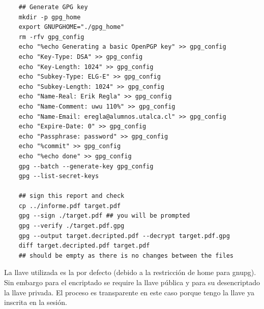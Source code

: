 \documentclass[11pt]{utalcaDoc}
\begin{document}
\begin{verbatim}
	## Generate GPG key
	mkdir -p gpg_home
	export GNUPGHOME="./gpg_home"
	rm -rfv gpg_config
	echo "%echo Generating a basic OpenPGP key" >> gpg_config
	echo "Key-Type: DSA" >> gpg_config
	echo "Key-Length: 1024" >> gpg_config
	echo "Subkey-Type: ELG-E" >> gpg_config
	echo "Subkey-Length: 1024" >> gpg_config
	echo "Name-Real: Erik Regla" >> gpg_config
	echo "Name-Comment: uwu 110%" >> gpg_config
	echo "Name-Email: eregla@alumnos.utalca.cl" >> gpg_config
	echo "Expire-Date: 0" >> gpg_config
	echo "Passphrase: password" >> gpg_config
	echo "%commit" >> gpg_config
	echo "%echo done" >> gpg_config
	gpg --batch --generate-key gpg_config
	gpg --list-secret-keys
	
	## sign this report and check
	cp ../informe.pdf target.pdf
	gpg --sign ./target.pdf ## you will be prompted
	gpg --verify ./target.pdf.gpg
	gpg --output target.decripted.pdf --decrypt target.pdf.gpg
	diff target.decripted.pdf target.pdf 
	## should be empty as there is no changes between the files
\end{verbatim}

La llave utilizada es la por defecto (debido a la restricción de home para gnupg). Sin embargo para el encriptado se require la llave pública y para su desencriptado la llave privada. El proceso es transparente en este caso porque tengo la llave ya inscrita en la sesión.
\end{document}

